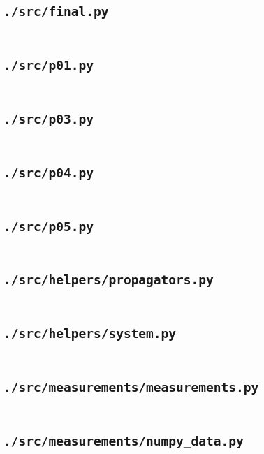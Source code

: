 \subsection*{\texttt{./src/final.py}}
\inputminted{python}{./src/final.py}

\subsection*{\texttt{./src/p01.py}}
\inputminted{python}{./src/p01.py}

\subsection*{\texttt{./src/p03.py}}
\inputminted{python}{./src/p03.py}

\subsection*{\texttt{./src/p04.py}}
\inputminted{python}{./src/p04.py}

\subsection*{\texttt{./src/p05.py}}
\inputminted{python}{./src/p05.py}

\subsection*{\texttt{./src/helpers/propagators.py}}
\inputminted{python}{./src/helpers/propagators.py}

\subsection*{\texttt{./src/helpers/system.py}}
\inputminted{python}{./src/helpers/system.py}

\subsection*{\texttt{./src/measurements/measurements.py}}
\inputminted{python}{./src/measurements/measurements.py}

\subsection*{\texttt{./src/measurements/numpy_data.py}}
\inputminted{python}{./src/measurements/numpy_data.py}


